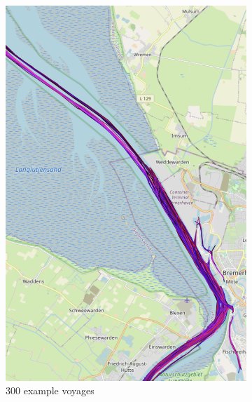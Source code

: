 \begin{figure}[H]
    \centering
    \begin{minipage}{.45\linewidth}
            \begin{subfigure}[t]{.9\linewidth}
                \includegraphics[width=\textwidth]{images/ais/tracks/tanker.png}
                \caption{300 example voyages}
                \label{fig:tankerOverview}
            \end{subfigure}
        \end{minipage}
    \begin{minipage}{.45\linewidth}
        \begin{subfigure}[t]{.9\linewidth}

\end{subfigure}
\end{minipage}
\end{figure}
